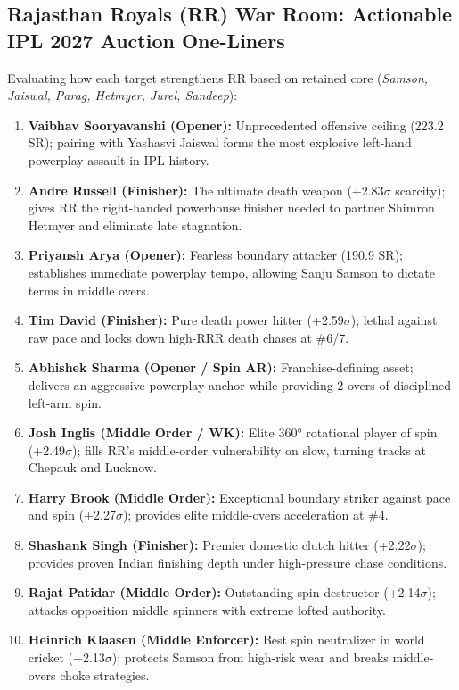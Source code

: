 \documentclass[10pt,a4paper]{article}
\begin{document}
\subsection*{Rajasthan Royals (RR) War Room: Actionable IPL 2027 Auction One-Liners}
Evaluating how each target strengthens RR based on retained core (\textit{Samson, Jaiswal, Parag, Hetmyer, Jurel, Sandeep}):
\begin{enumerate}[leftmargin=1.2em]
    \item \textbf{Vaibhav Sooryavanshi (Opener):} Unprecedented offensive ceiling (223.2 SR); pairing with Yashasvi Jaiswal forms the most explosive left-hand powerplay assault in IPL history.
    \item \textbf{Andre Russell (Finisher):} The ultimate death weapon (+2.83$\sigma$ scarcity); gives RR the right-handed powerhouse finisher needed to partner Shimron Hetmyer and eliminate late stagnation.
    \item \textbf{Priyansh Arya (Opener):} Fearless boundary attacker (190.9 SR); establishes immediate powerplay tempo, allowing Sanju Samson to dictate terms in middle overs.
    \item \textbf{Tim David (Finisher):} Pure death power hitter (+2.59$\sigma$); lethal against raw pace and locks down high-RRR death chases at \#6/7.
    \item \textbf{Abhishek Sharma (Opener / Spin AR):} Franchise-defining asset; delivers an aggressive powerplay anchor while providing 2 overs of disciplined left-arm spin.
    \item \textbf{Josh Inglis (Middle Order / WK):} Elite 360° rotational player of spin (+2.49$\sigma$); fills RR's middle-order vulnerability on slow, turning tracks at Chepauk and Lucknow.
    \item \textbf{Harry Brook (Middle Order):} Exceptional boundary striker against pace and spin (+2.27$\sigma$); provides elite middle-overs acceleration at \#4.
    \item \textbf{Shashank Singh (Finisher):} Premier domestic clutch hitter (+2.22$\sigma$); provides proven Indian finishing depth under high-pressure chase conditions.
    \item \textbf{Rajat Patidar (Middle Order):} Outstanding spin destructor (+2.14$\sigma$); attacks opposition middle spinners with extreme lofted authority.
    \item \textbf{Heinrich Klaasen (Middle Enforcer):} Best spin neutralizer in world cricket (+2.13$\sigma$); protects Samson from high-risk wear and breaks middle-overs choke strategies.
\end{enumerate}
\end{document}
